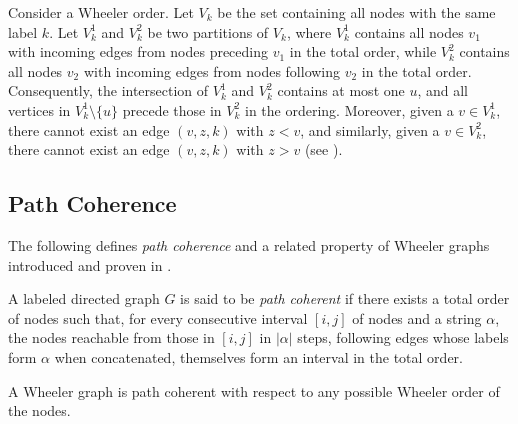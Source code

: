 \begin{lemma} \label{property_4}
    Consider a  Wheeler order. Let $V_k$ be the set containing all nodes with the same label $k$. Let $V_k^1$ and $V_k^2$ be two partitions of $V_k$, where $V_k^1$ contains all nodes $v_1$ with incoming edges from nodes preceding $v_1$ in the total order, while $V_k^2$ contains all nodes $v_2$ with incoming edges from nodes following $v_2$ in the total order. Consequently, the intersection of $V_k^1$ and $V_k^2$ contains at most one  $u$, and all vertices in $V_k^1 \setminus \{u\}$ precede those in $V_k^2$ in the ordering. Moreover, given a  $v \in V_k^1$, there cannot exist an edge $(v, z, k)$ with $z<v$, and similarly, given a  $v \in V_k^2$, there cannot exist an edge $(v, z, k)$ with $z>v$ (see \cite{inapproximabilityWheelerGraphs} ).
\end{lemma}

\subsection{Path Coherence}
The following defines \textit{path coherence} and a related property of Wheeler graphs introduced and proven in \cite{gagie2017wheeler}.

\begin{definition}
    A labeled directed graph $G$ is said to be \textit{path coherent} if there exists a total order of nodes such that, for every consecutive interval $[i, j]$ of nodes and a string $\alpha$, the nodes reachable from those in $[i, j]$ in $|\alpha |$ steps, following edges whose labels form $\alpha$ when concatenated, themselves form an interval in the total order.
\end{definition}

\begin{lemma} \label{property_5}
    A Wheeler graph is path coherent with respect to any possible Wheeler order of the nodes.
\end{lemma}

